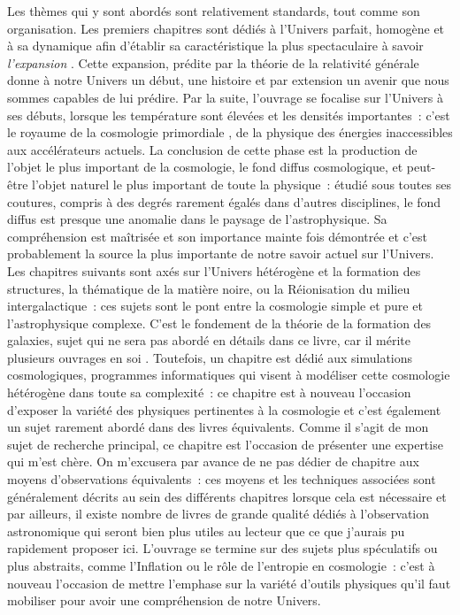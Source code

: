 Les thèmes qui y sont abordés sont relativement standards, tout comme son organisation. Les premiers chapitres sont dédiés à l'Univers parfait, homogène et à sa dynamique afin d'établir sa caractéristique la plus spectaculaire à savoir \textit{l'expansion} . Cette expansion, prédite par la théorie de la relativité générale donne à notre Univers un début, une histoire et par extension un avenir que nous sommes capables de lui prédire. Par la suite, l'ouvrage se focalise sur l'Univers à ses débuts, lorsque les température sont élevées et les densités importantes~: c'est le royaume de la cosmologie primordiale , de la physique des énergies inaccessibles aux accélérateurs actuels. La conclusion de cette phase est la production de l'objet le plus important de la cosmologie, le fond diffus cosmologique, et peut-être l'objet naturel le plus important de toute la physique~: étudié sous toutes ses coutures, compris à des degrés rarement égalés dans d'autres disciplines, le fond diffus est presque une anomalie dans le paysage de l'astrophysique. Sa compréhension est maîtrisée et son importance mainte fois démontrée et c'est probablement la source la plus importante de notre savoir actuel sur l'Univers. Les chapitres suivants sont axés sur l'Univers hétérogène et la formation des structures, la thématique de la matière noire, ou la Réionisation du milieu intergalactique~: ces sujets sont le pont entre la cosmologie simple et pure et l'astrophysique complexe. C'est le fondement de la théorie de la formation des galaxies, sujet qui ne sera pas abordé en détails dans ce livre, car il mérite plusieurs ouvrages en soi . Toutefois, un chapitre est dédié aux simulations cosmologiques, programmes informatiques qui visent à modéliser cette cosmologie hétérogène dans toute sa complexité~: ce chapitre est à nouveau l'occasion d'exposer la variété des physiques pertinentes à la cosmologie et c'est également un sujet rarement abordé dans des livres équivalents. Comme il s'agit de mon sujet de recherche principal, ce chapitre est l'occasion de présenter une expertise qui m'est chère. On m'excusera par avance de ne pas dédier de chapitre aux moyens d'observations équivalents~: ces moyens et les techniques associées sont généralement décrits au sein des différents chapitres lorsque cela est nécessaire et par ailleurs, il existe nombre de livres de grande qualité dédiés à l'observation astronomique qui seront bien plus utiles au lecteur que ce que j'aurais pu rapidement proposer ici. L'ouvrage se termine sur des sujets plus spéculatifs ou plus abstraits, comme l'Inflation ou le rôle de l'entropie en cosmologie~: c'est à nouveau l'occasion de mettre l'emphase sur la variété d'outils physiques qu'il faut mobiliser pour avoir une compréhension de notre Univers.

